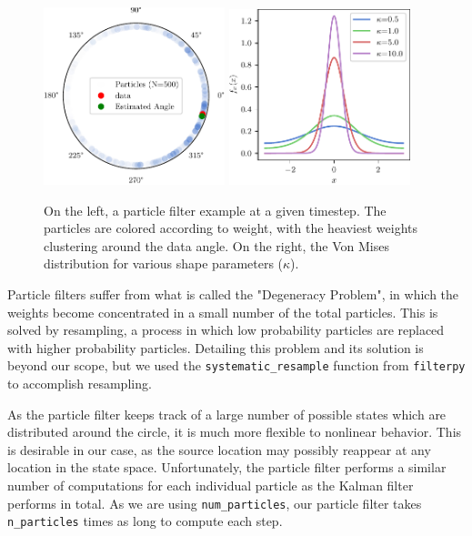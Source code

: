 \documentclass[11pt]{amsart}
\begin{document}
\begin{figure}[htp]
    \centering
    \includegraphics[width=0.47\textwidth]{actual_paper_graphs/particle_filter_example.pdf}\hfill
    \includegraphics[width=0.47\textwidth]{actual_paper_graphs/von_mises_pdf.pdf}\hfill
    \caption{On the left, a particle filter example at a given timestep. The particles are colored according to weight, with the heaviest weights clustering around the data angle. On the right, the Von Mises distribution for various shape parameters ($\kappa$).}
    \label{fig:particle_filter_stuff}
\end{figure}

Particle filters suffer from what is called the "Degeneracy Problem", in which the weights become concentrated in a small number of the total particles. This is solved by resampling, a process in which low probability particles are replaced 
with higher probability particles. Detailing this problem and its solution is beyond our scope, but we used the \lstinline{systematic_resample} function from \lstinline{filterpy} to accomplish resampling.

As the particle filter keeps track of a large number of possible states which are distributed around the circle, it is much more flexible to nonlinear behavior. This is desirable in our case, as the source location may possibly reappear at any 
location in the state space. Unfortunately, the particle filter performs a similar number of computations for each individual particle as the Kalman filter performs in total. As we are using \lstinline{num_particles}, our particle filter takes \lstinline{n_particles} 
times as long to compute each step.
\end{document}
